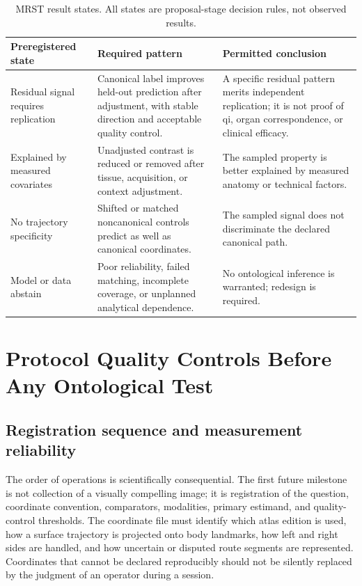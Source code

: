 \documentclass[conference]{IEEEtran}
\begin{document}
\begin{table}[!t]
\caption{MRST result states. All states are proposal-stage decision rules, not observed results.}
\label{tab:states}
\centering
\footnotesize
\begin{tabular}{p{}|p{}|p{}}
\hline
\textbf{Preregistered state} & \textbf{Required pattern} & \textbf{Permitted conclusion} \\
\hline
Residual signal requires replication & Canonical label improves held-out prediction after adjustment, with stable direction and acceptable quality control. & A specific residual pattern merits independent replication; it is not proof of qi, organ correspondence, or clinical efficacy. \\
\hline
Explained by measured covariates & Unadjusted contrast is reduced or removed after tissue, acquisition, or context adjustment. & The sampled property is better explained by measured anatomy or technical factors. \\
\hline
No trajectory specificity & Shifted or matched noncanonical controls predict as well as canonical coordinates. & The sampled signal does not discriminate the declared canonical path. \\
\hline
Model or data abstain & Poor reliability, failed matching, incomplete coverage, or unplanned analytical dependence. & No ontological inference is warranted; redesign is required. \\
\hline
\end{tabular}
\end{table}

\section{Protocol Quality Controls Before Any Ontological Test}

\subsection{Registration sequence and measurement reliability}

The order of operations is scientifically consequential. The first future milestone is not collection of a visually compelling image; it is registration of the question, coordinate convention, comparators, modalities, primary estimand, and quality-control thresholds. The coordinate file must identify which atlas edition is used, how a surface trajectory is projected onto body landmarks, how left and right sides are handled, and how uncertain or disputed route segments are represented. Coordinates that cannot be declared reproducibly should not be silently replaced by the judgment of an operator during a session.
\end{document}
